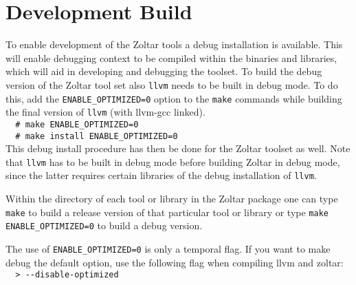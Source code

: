 \section{Development Build}
  
To enable development of the Zoltar tools a debug installation is available.
This will enable debugging context to be compiled within the binaries and libraries,
which will aid in developing and debugging the toolset.
To build the debug version of the Zoltar tool set
also \verb|llvm| needs to be built in debug mode.
To do this, add the \verb|ENABLE_OPTIMIZED=0| option to the \verb|make|
commands while building the final version of \verb|llvm| (with llvm-gcc linked).\\
\verb|  # make ENABLE_OPTIMIZED=0| \\
\verb|  # make install ENABLE_OPTIMIZED=0| \\
This debug install procedure has then be done for the Zoltar toolset as well.
Note that \verb|llvm| has to be built in debug mode before building Zoltar in debug mode,
since the latter requires certain libraries of the debug installation of \verb|llvm|.

Within the directory of each tool or library in the Zoltar package one can type
\verb|make| to build a release version of that particular tool or library or type
\verb|make ENABLE_OPTIMIZED=0| to build a debug version.

The use of \verb|ENABLE_OPTIMIZED=0| is only a temporal flag. If you want to make
debug the default option, use the following flag when compiling llvm and zoltar:\\
\verb|  > --disable-optimized |\\

